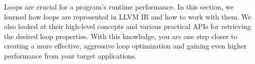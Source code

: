 Loops are crucial for a program's runtime performance. In this section, we learned how loops are represented in LLVM IR and how to work with them. We also looked at their high-level concepts and various practical APIs for retrieving the desired loop properties. With this knowledge, you are one step closer to creating a more effective, aggressive loop optimization and gaining even higher performance from your target applications.













